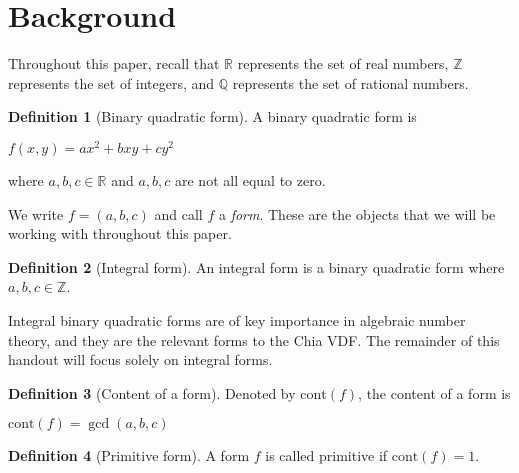 \documentclass{article}
\theoremstyle{definition}
\newtheorem{definition}{Definition}[section]
\theoremstyle{theorem}
\theoremstyle{example}
\theoremstyle{corollary}
\begin{document}
\section{Background}

\bigskip

Throughout this paper, recall that \(\mathbb{R}\) represents the set of real numbers, \(\mathbb{Z}\) represents the set of integers, and \(\mathbb{Q}\) represents the set of rational numbers.

\bigskip

\theoremstyle{definition}
\begin{definition}[Binary quadratic form]
A binary quadratic form is
\begin{center}
\(f(x, y) = a x^{2} + b x y + c y^{2}\)
\end{center}
where \(a, b, c \in \mathbb{R}\) and \(a, b, c\) are not all equal to zero.
\end{definition}

\bigskip

We write \(f = (a, b, c)\) and call \(f\) a \textit{form}. These are the objects that we will be working with throughout this paper.

\bigskip

\theoremstyle{definition}
\begin{definition}[Integral form]
An integral form is a binary quadratic form where \(a, b, c \in \mathbb{Z}\).
\end{definition}

\bigskip

Integral binary quadratic forms are of key importance in algebraic number theory, and they are the relevant forms to the Chia VDF. The remainder of this handout will focus solely on integral forms.

\bigskip

\theoremstyle{definition}
\begin{definition}[Content of a form]
Denoted by \(\textrm{cont}(f)\), the content of a form is
\begin{center}
\(\textrm{cont}(f) = \gcd(a, b, c)\)
\end{center}
\end{definition}

\bigskip

\theoremstyle{definition}
\begin{definition}[Primitive form]
A form \(f\) is called primitive if \(\textrm{cont}(f) = 1\).
\end{definition}
\end{document}

